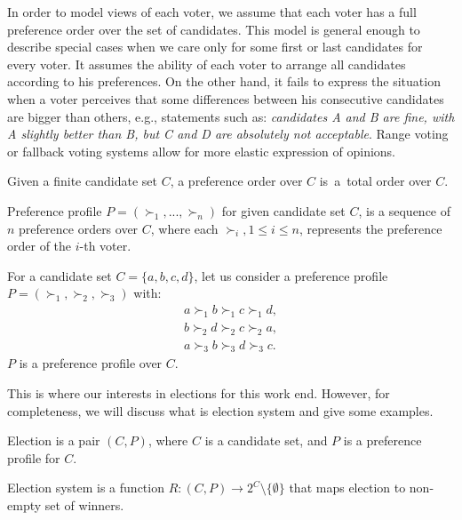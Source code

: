 In order to model views of each voter,
we assume that each voter has a full preference order over the set of candidates.
This model is general enough to describe special cases
when we care only for some first or last candidates for every voter.
It assumes the ability of each voter to arrange all candidates according to his preferences.
On the other hand, it fails to express the situation when a voter perceives that some differences
between his consecutive candidates are bigger than others, e.g., statements such as:
\textit{candidates A and B are fine, with A slightly better than B, but C and D are absolutely not acceptable}.
Range voting \cite{rangevoting} or fallback voting \cite{fallbackvoting} systems
allow for more elastic expression of opinions.

\begin{defn}
Given a finite candidate set $C$, a preference order over $C$
is~a~total order over $C$.
\end{defn}

\begin{defn}
Preference profile $P = (\succ_1, ... , \succ_n)$ for given candidate set $C$,
is a sequence of $n$ preference orders over $C$,
where each $\succ_i, 1 \leq i \leq n$, represents the preference order of the $i$-th voter.
\end{defn}

\begin{exmp}
For a candidate set $C = \{a, b, c, d\}$,
let us consider a preference profile $P = (\succ_1, \succ_2, \succ_3)$ with:
\begin{align*}
a \succ_1 b \succ_1 c \succ_1 d, \\
b \succ_2 d \succ_2 c \succ_2 a,	\\
a \succ_3 b \succ_3 d \succ_3 c.
\end{align*}
$P$ is a preference profile over $C$.
\end{exmp}

This is where our interests in elections for this work end.
However, for completeness, we will discuss what is election system and give some examples.

\begin{defn}[election]
Election is a pair $(C, P)$, where $C$ is a candidate set, and $P$ is a preference profile for $C$.
\end{defn}

\begin{defn}
Election system is a function $R : (C,P) \rightarrow 2^{C} \setminus \{\emptyset\}$
that maps election to non-empty set of winners.
\end{defn}

